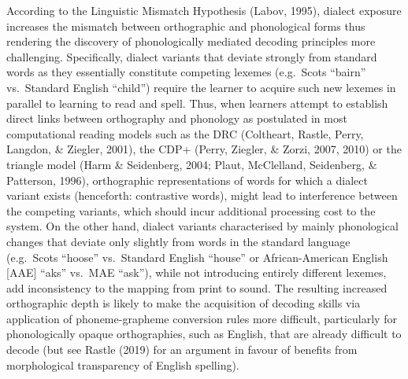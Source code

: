 \documentclass[doc,floatsintext]{apa6}
\begin{document}
According to the Linguistic Mismatch Hypothesis (Labov, 1995), dialect
exposure increases the mismatch between orthographic and phonological
forms thus rendering the discovery of phonologically mediated decoding
principles more challenging. Specifically, dialect variants that deviate
strongly from standard words as they essentially constitute competing
lexemes (e.g.~Scots \enquote{bairn} vs.~Standard English
\enquote{child}) require the learner to acquire such new lexemes in
parallel to learning to read and spell. Thus, when learners attempt to
establish direct links between orthography and phonology as postulated
in most computational reading models such as the DRC (Coltheart, Rastle,
Perry, Langdon, \& Ziegler, 2001), the CDP+ (Perry, Ziegler, \& Zorzi,
2007, 2010) or the triangle model (Harm \& Seidenberg, 2004; Plaut,
McClelland, Seidenberg, \& Patterson, 1996), orthographic
representations of words for which a dialect variant exists (henceforth:
contrastive words), might lead to interference between the competing
variants, which should incur additional processing cost to the system.
On the other hand, dialect variants characterised by mainly phonological
changes that deviate only slightly from words in the standard language
(e.g.~Scots \enquote{hoose} vs.~Standard English \enquote{house} or
African-American English {[}AAE{]} \enquote{aks} vs.~MAE \enquote{ask}),
while not introducing entirely different lexemes, add inconsistency to
the mapping from print to sound. The resulting increased orthographic
depth is likely to make the acquisition of decoding skills via
application of phoneme-grapheme conversion rules more difficult,
particularly for phonologically opaque orthographies, such as English,
that are already difficult to decode (but see Rastle (2019) for an
argument in favour of benefits from morphological transparency of
English spelling).
\end{document}
